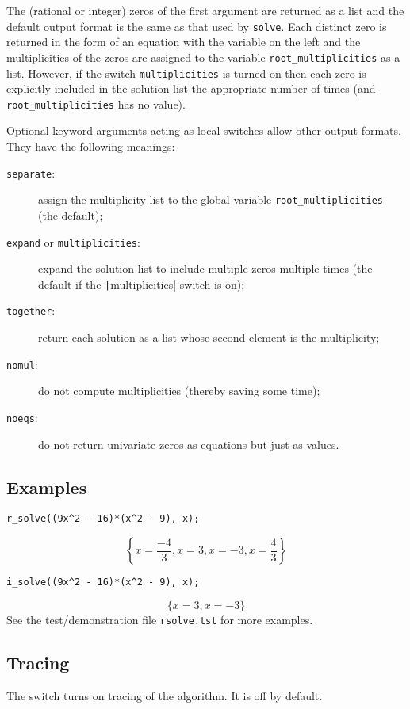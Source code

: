 The (rational or integer) zeros of the first argument are returned as
a list and the default output format is the same as that used by
\verb|solve|.  Each distinct zero is returned in the form of an
equation with the variable on the left and the multiplicities of the
zeros are assigned to the variable \verb|root_multiplicities| as a
list.  However, if the switch \verb|multiplicities| is turned on then
each zero is explicitly included in the solution list the appropriate
number of times (and \verb|root_multiplicities| has no value).
  
\begin{sloppypar}
Optional keyword arguments acting as local switches allow other output
formats.  They have the following meanings:
\begin{description}
\item[\texttt{separate}:] assign the multiplicity list to the global
  variable \texttt{root\_multiplicities} (the default);
\item[\texttt{expand} or \texttt{multiplicities}:] expand the solution
  list to include multiple zeros multiple times (the default if the
  \texttt|multiplicities| switch is on);
\item[\texttt{together}:] return each solution as a list whose second
  element is the multiplicity;
\item[\texttt{nomul}:] do not compute multiplicities (thereby saving
  some time);
\item[\texttt{noeqs}:] do not return univariate zeros as equations but
  just as values.
\end{description}
\end{sloppypar}


\subsection{Examples}

\begin{verbatim}
r_solve((9x^2 - 16)*(x^2 - 9), x);
\end{verbatim}
\[
  \left\{x=\frac{-4}{3},x=3,x=-3,x=\frac{4}{3}\right\}
\]
\begin{verbatim}
i_solve((9x^2 - 16)*(x^2 - 9), x);
\end{verbatim}
\[
  \{x=3,x=-3\}
\]
See the test/demonstration file \verb|rsolve.tst| for more examples.


\subsection{Tracing}

The switch  turns on tracing of the algorithm.  It is off
by default.

